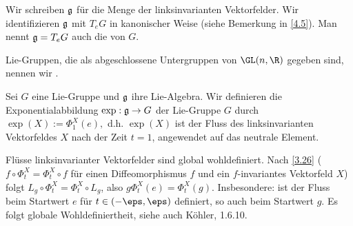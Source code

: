 \begin{df} \label{4.7}
    Wir schreiben $\mathfrak{g}$ für die Menge der linksinvarianten Vektorfelder.
    Wir identifizieren $\mathfrak{g}$ mit $T_e G$ in kanonischer Weise (siehe Bemerkung in \ref{4.5}).
    Man nennt $\mathfrak{g} = T_e G$ auch die  von $G$.
\end{df}

\begin{df} \label{4.8}
    Lie-Gruppen, die als abgeschlossene Untergruppen von $\GL(n, \R)$ gegeben sind, nennen wir .
\end{df}

\begin{df} \label{4.9}
    Sei $G$ eine Lie-Gruppe und $\mathfrak{g}$ ihre Lie-Algebra.
    Wir definieren die Exponentialabbildung $\exp: \mathfrak{g} \to G$ der Lie-Gruppe $G$ durch
    \begin{math}
        \exp(X) := \Phi_1^X(e),
    \end{math}
    d.h. $\exp(X)$ ist der Fluss des linksinvarianten Vektorfeldes $X$ nach der Zeit $t = 1$, angewendet auf das neutrale Element.
    \begin{note}
        Flüsse linksinvarianter Vektorfelder sind global wohldefiniert.
        Nach \ref{3.26} ($f \circ \Phi_t^X = \Phi_t^X \circ f$ für einen Diffeomorphismus $f$ und ein $f$-invariantes Vektorfeld $X$) folgt $L_g \circ \Phi_t^X = \Phi_t^X \circ L_g$, also
        \begin{math}
            g \Phi_t^X(e) = \Phi_t^X(g).
        \end{math}
        Insbesondere: ist der Fluss beim Startwert $e$ für $t \in (-\eps, \eps)$ definiert, so auch beim Startwert $g$.
        Es folgt globale Wohldefiniertheit, siehe auch Köhler, 1.6.10.
    \end{note}
\end{df}

